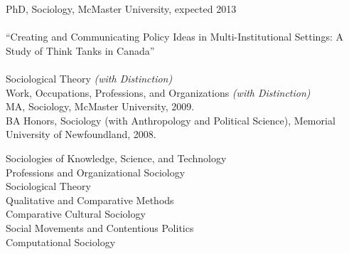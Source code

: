 \documentclass[11pt,usenames,dvipsnames]{article}
\begin{document}
\bigskip

\reversemarginpar

\medskip 



\medskip 
{}

\noindent PhD, Sociology, McMaster University, expected 2013\\ 

\\ 
``Creating and Communicating Policy Ideas in Multi-Institutional Settings: A Study of Think Tanks in Canada''\\

\\
Sociological Theory {\it (with Distinction)}\\
Work, Occupations, Professions, and Organizations {\it (with Distinction)}\\

\noindent MA, Sociology, McMaster University, 2009.\\

\noindent BA Honors, Sociology (with Anthropology and Political Science), Memorial University of Newfoundland, 2008.\\



\noindent Sociologies of Knowledge, Science, and Technology \\
Professions and Organizational Sociology\\ 
Sociological Theory\\
Qualitative and Comparative Methods\\ 
Comparative Cultural Sociology \\
Social Movements and Contentious Politics\\
Computational Sociology \\
\end{document}

